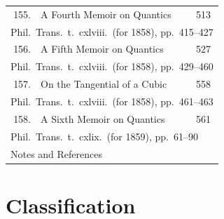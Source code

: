 \documentclass[11pt,a4paper]{book}
\begin{document}
\begin{longtable}{rp{8cm}l}
155. & A Fourth Memoir on Quantics & 513\\
\multicolumn{3}{l}{\small Phil.\ Trans.\ t.\ cxlviii.\ (for 1858), pp.\ 415--427}\\[0.5em]
156. & A Fifth Memoir on Quantics & 527\\
\multicolumn{3}{l}{\small Phil.\ Trans.\ t.\ cxlviii.\ (for 1858), pp.\ 429--460}\\[0.5em]
157. & On the Tangential of a Cubic & 558\\
\multicolumn{3}{l}{\small Phil.\ Trans.\ t.\ cxlviii.\ (for 1858), pp.\ 461--463}\\[0.5em]
158. & A Sixth Memoir on Quantics & 561\\
\multicolumn{3}{l}{\small Phil.\ Trans.\ t.\ cxlix.\ (for 1859), pp.\ 61--90}\\[0.5em]
\multicolumn{3}{l}{Notes and References \dotfill 593}\\
\bottomrule
\end{longtable}
\clearpage

\section*{Classification}
\end{document}
